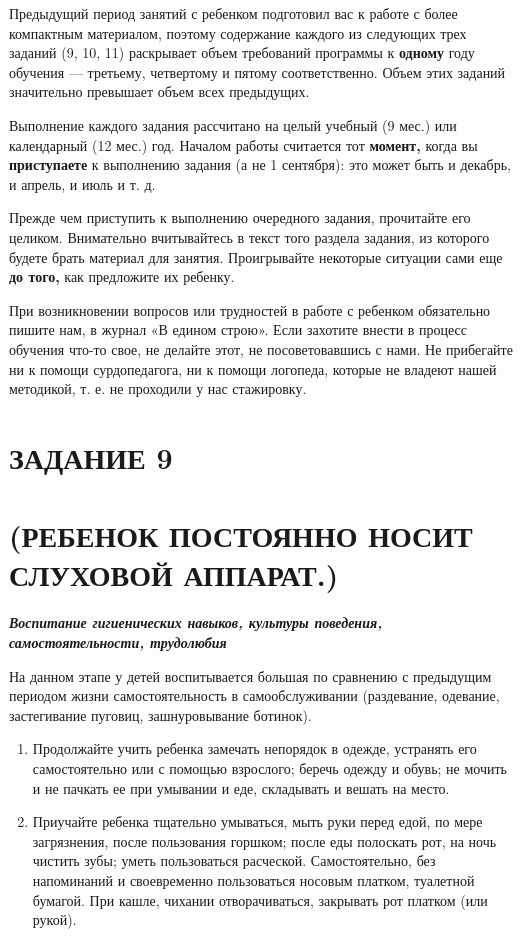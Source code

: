 \documentclass{book}
\newcounter{structure}
\renewcommand{\emph}[1]{\textit{#1}}
\begin{document}

Предыдущий период занятий с ребенком подготовил вас к работе с более
компактным материалом, поэтому содержание каждого из следующих трех
заданий (9, 10, 11) раскрывает объем требований программы к
\textbf{одному} году обучения --- третьему, четвертому и пятому
соответственно. Объем этих заданий значительно превышает объем всех
предыдущих.

Выполнение каждого задания рассчитано на целый учебный (9 мес.) или
календарный (12 мес.) год. Началом работы считается тот \textbf{момент,}
когда вы \textbf{приступаете} к выполнению задания (а не 1 сентября):
это может быть и декабрь, и апрель, и июль и т. д.

Прежде чем приступить к выполнению очередного задания, прочитайте его
целиком. Внимательно вчитывайтесь в текст того раздела задания, из
которого будете брать материал для занятия. Проигрывайте некоторые
ситуации сами еще \textbf{до того,} как предложите их ребенку.

При возникновении вопросов или трудностей в работе с ребенком
обязательно пишите нам, в журнал «В едином строю». Если захотите внести
в процесс обучения что-то свое, не делайте этот, не посоветовавшись с
нами. Не прибегайте ни к помощи сурдопедагога, ни к помощи логопеда,
которые не владеют нашей методикой, т. е. не проходили у нас стажировку.

\section{ЗАДАНИЕ 9}\section*{(РЕБЕНОК ПОСТОЯННО НОСИТ СЛУХОВОЙ АППАРАТ.)}

\emph{\textbf{Воспитание гигиенических навыков, культуры поведения,
самостоятельности, трудолюбия}}

На данном этапе у детей воспитывается большая по сравнению с предыдущим
периодом жизни самостоятельность в самообслуживании (раздевание,
одевание, застегивание пуговиц, зашнуровывание ботинок).


\begin{enumerate}
\def\labelenumi{\arabic{enumi}.}
\item
  
  Продолжайте учить ребенка замечать непорядок в одежде, устранять его
  самостоятельно или с помощью взрослого; беречь одежду и обувь; не
  мочить и не пачкать ее при умывании и еде, складывать и вешать на
  место.
  
\item
  
  Приучайте ребенка тщательно умываться, мыть руки перед едой, по мере
  загрязнения, после пользования горшком; после еды полоскать рот, на
  ночь чистить зубы; уметь пользоваться расческой. Самостоятельно, без
  напоминаний и своевременно пользоваться носовым платком, туалетной
  бумагой. При кашле, чихании отворачиваться, закрывать рот платком (или
  рукой).
  
\end{enumerate}
\end{document}
